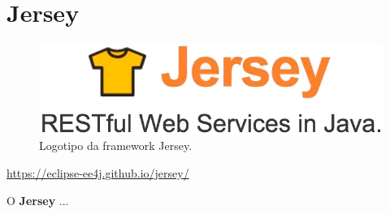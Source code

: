 \section{Jersey}
\label{subsec:jersey}

\begin{figure}[H]
    \centering
    \includegraphics[scale=0.25]{images/jersey.png}
    \caption{Logotipo da framework Jersey.}
    \label{fig:jersey}
\end{figure}

\href{https://eclipse-ee4j.github.io/jersey/}{https://eclipse-ee4j.github.io/jersey/}

\hspace{5mm} O \textbf{Jersey} ...